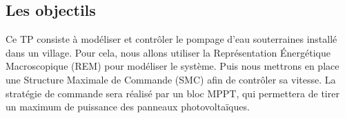 \subsection{Les objectils}

Ce TP consiste à modéliser et contrôler le pompage d'eau souterraines installé dans un village. Pour cela, nous allons utiliser la Représentation Énergétique Macroscopique (REM) pour modéliser le système. Puis nous mettrons en place une Structure Maximale de Commande (SMC) afin de contrôler sa vitesse.
	La stratégie de commande sera réalisé par un bloc MPPT, qui permettera de tirer un maximum de puissance des panneaux photovoltaïques. 
